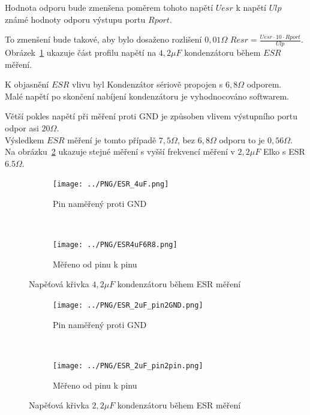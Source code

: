 Hodnota odporu bude zmenšena poměrem tohoto napětí \(Uesr\) k napětí \(Ulp\) známé hodnoty odporu výstupu
portu \(Rport\).

To zmenšení bude takové, aby bylo dosaženo rozlišení \(0,01 \Omega\) 
 \(Resr = \frac{Uesr \cdot 10 \cdot Rport}{Ulp}\).\\
Obrázek~\ref{pic:esr4} ukazuje část profilu napětí na \(4,2\mu F\) kondenzátoru během \(ESR\) měření.
 
K objasnění \(ESR\) vlivu byl Kondenzátor sériově propojen s \(6,8 \Omega\) odporem.\\ 
Malé napětí po skončení nabíjení kondenzátoru je vyhodnocováno softwarem.

Větší pokles napětí při měření proti GND je způsoben vlivem výstupního portu odpor asi \(20\Omega\).\\
Výsledkem \(ESR\) měření je tomto případě \(7,5 \Omega\), bez \(6,8 \Omega\) odporu to je \(0,56\Omega\).\\
Na obrázku~\ref{pic:esr2} ukazuje stejné měření s vyšší frekvencí měření v \(2,2\mu F\)
Elko s ESR \(6.5\Omega\).


\begin{figure}[H]
  \begin{subfigure}[b]{9cm}
    \centering
    \texttt{[image: ../PNG/ESR\_4uF.png]}
    \caption{Pin naměřený proti GND}
  \end{subfigure}
  ~
  \begin{subfigure}[b]{9cm}
    \centering
    \texttt{[image: ../PNG/ESR4uF6R8.png]}
    \caption{Měřeno od pinu k pinu}
  \end{subfigure}
  \caption{Napěťová křivka \(4,2\mu F\) kondenzátoru během ESR měření}
  \label{pic:esr4}
\end{figure}

\begin{figure}[H]
  \begin{subfigure}[b]{9cm}
    \centering
    \texttt{[image: ../PNG/ESR\_2uF\_pin2GND.png]}
    \caption{Pin naměřený proti GND}
  \end{subfigure}
  ~
  \begin{subfigure}[b]{9cm}
    \centering
    \texttt{[image: ../PNG/ESR\_2uF\_pin2pin.png]}
    \caption{Měřeno od pinu k pinu}
  \end{subfigure}
  \caption{Napěťová křivka \(2,2\mu F\)  kondenzátoru během ESR měření}
  \label{pic:esr2}
\end{figure}

